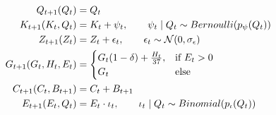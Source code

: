 \begin{align}
    Q_{t+1}(Q_t) &= Q_t \\
    K_{t+1}(K_t, Q_t)  &= K_{t} + \psi_t, \qquad \psi_t \mid Q_t \sim Bernoulli(p_\psi(Q_t))  \\
    Z_{t+1}(Z_t) &= Z_t + \epsilon_t, \qquad \epsilon_t \sim \mathcal{N}(0, \sigma_\epsilon)\\
    G_{t+1}(G_t, H_t, E_t) &= 
    \begin{cases}
        G_t(1 - \delta) + \frac{H_t}{37}, & \text{if } E_t > 0 \\
        G_t & \text{else}
    \end{cases} \\
    C_{t+1}(C_t, B_{t+1}) &= C_{t} + B_{t+1} \\
    E_{t+1}(E_t, Q_t) &= E_t \cdot \iota_t, \qquad \iota_t \mid Q_t \sim Binomial(p_\iota(Q_t))
\end{align}


